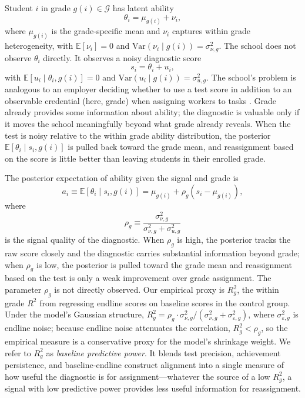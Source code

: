 \documentclass[11pt]{article}
\newcommand{\E}{\mathbb{E}}
\begin{document}
Student $i$ in grade $g(i) \in \mathcal{G}$ has latent ability
\begin{equation}
\label{eq:ability}
\theta_i = \mu_{g(i)} + \nu_i,
\end{equation}
where $\mu_{g(i)}$ is the grade-specific mean and $\nu_i$ captures within grade heterogeneity, with $\E[\nu_i] = 0$ and $\text{Var}(\nu_i \mid g(i)) = \sigma^2_{\nu,g}$. The school does not observe $\theta_i$ directly. It observes a noisy diagnostic score
\begin{equation}
\label{eq:score}
s_i = \theta_i + u_i,
\end{equation}
with $\E[u_i \mid \theta_i, g(i)] = 0$ and $\text{Var}(u_i \mid g(i)) = \sigma^2_{u,g}$. The school's problem is analogous to an employer deciding whether to use a test score in addition to an observable credential (here, grade) when assigning workers to tasks \citep{AutorScarborough2008}. Grade already provides some information about ability; the diagnostic is valuable only if it moves the school meaningfully beyond what grade already reveals. When the test is noisy relative to the within grade ability distribution, the posterior $\E[\theta_i \mid s_i, g(i)]$ is pulled back toward the grade mean, and reassignment based on the score is little better than leaving students in their enrolled grade.

The posterior expectation of ability given the signal and grade is
\begin{equation}
\label{eq:posterior}
a_i \equiv \E[\theta_i \mid s_i, g(i)] = \mu_{g(i)} + \rho_g(s_i - \mu_{g(i)}),
\end{equation}
where
\begin{equation}
\label{eq:signal_quality}
\rho_g \equiv \frac{\sigma^2_{\nu,g}}{\sigma^2_{\nu,g} + \sigma^2_{u,g}}
\end{equation}
is the signal quality of the diagnostic. When $\rho_g$ is high, the posterior tracks the raw score closely and the diagnostic carries substantial information beyond grade; when $\rho_g$ is low, the posterior is pulled toward the grade mean and reassignment based on the test is only a weak improvement over grade assignment. The parameter $\rho_g$ is not directly observed. Our empirical proxy is $R^2_g$, the within grade $R^2$ from regressing endline scores on baseline scores in the control group. Under the model's Gaussian structure, $R^2_g = \rho_g \cdot \sigma^2_{\nu,g}/(\sigma^2_{\nu,g} + \sigma^2_{\varepsilon,g})$, where $\sigma^2_{\varepsilon,g}$ is endline noise; because endline noise attenuates the correlation, $R^2_g < \rho_g$, so the empirical measure is a conservative proxy for the model's shrinkage weight. We refer to $R^2_g$ as \emph{baseline predictive power}. It blends test precision, achievement persistence, and baseline-endline construct alignment into a single measure of how useful the diagnostic is for assignment---whatever the source of a low $R^2_g$, a signal with low predictive power provides less useful information for reassignment.
\end{document}
